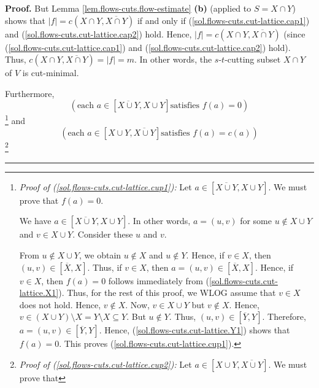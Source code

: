 \documentclass[numbers=enddot,12pt,final,onecolumn,notitlepage]{scrartcl}%
\theoremstyle{definition}
\newenvironment{proof}[1][Proof]{\noindent\textbf{#1.} }{\ \rule{0.5em}{0.5em}}
\begin{document}
\begin{proof}
But Lemma \ref{lem.flows-cuts.flow-estimate} \textbf{(b)} (applied to $S=X\cap
Y$) shows that $\left\vert f\right\vert =c\left(  X\cap Y,\overline{X\cap
Y}\right)  $ if and only if (\ref{sol.flows-cuts.cut-lattice.cap1}) and
(\ref{sol.flows-cuts.cut-lattice.cap2}) hold. Hence, $\left\vert f\right\vert
=c\left(  X\cap Y,\overline{X\cap Y}\right)  $ (since
(\ref{sol.flows-cuts.cut-lattice.cap1}) and
(\ref{sol.flows-cuts.cut-lattice.cap2}) hold). Thus, $c\left(  X\cap
Y,\overline{X\cap Y}\right)  =\left\vert f\right\vert =m$. In other words, the
$s$-$t$-cutting subset $X\cap Y$ of $V$ is cut-minimal.

Furthermore,
\begin{equation}
\left(  \text{each }a\in\left[  \overline{X\cup Y},X\cup Y\right]  \text{
satisfies }f\left(  a\right)  =0\right)
\label{sol.flows-cuts.cut-lattice.cup1}%
\end{equation}
\footnote{\textit{Proof of (\ref{sol.flows-cuts.cut-lattice.cup1}):} Let
$a\in\left[  \overline{X\cup Y},X\cup Y\right]  $. We must prove that
$f\left(  a\right)  =0$.
\par
We have $a\in\left[  \overline{X\cup Y},X\cup Y\right]  $. In other words,
$a=\left(  u,v\right)  $ for some $u\notin X\cup Y$ and $v\in X\cup Y$.
Consider these $u$ and $v$.
\par
From $u\notin X\cup Y$, we obtain $u\notin X$ and $u\notin Y$. Hence, if $v\in
X$, then $\left(  u,v\right)  \in\left[  \overline{X},X\right]  $. Thus, if
$v\in X$, then $a=\left(  u,v\right)  \in\left[  \overline{X},X\right]  $.
Hence, if $v\in X$, then $f\left(  a\right)  =0$ follows immediately from
(\ref{sol.flows-cuts.cut-lattice.X1}). Thus, for the rest of this proof, we
WLOG assume that $v\in X$ does not hold. Hence, $v\notin X$. Now, $v\in X\cup
Y$ but $v\notin X$. Hence, $v\in\left(  X\cup Y\right)  \setminus X=Y\setminus
X\subseteq Y$. But $u\notin Y$. Thus, $\left(  u,v\right)  \in\left[
\overline{Y},Y\right]  $. Therefore, $a=\left(  u,v\right)  \in\left[
\overline{Y},Y\right]  $. Hence, (\ref{sol.flows-cuts.cut-lattice.Y1}) shows
that $f\left(  a\right)  =0$. This proves
(\ref{sol.flows-cuts.cut-lattice.cup1}).} and%
\begin{equation}
\left(  \text{each }a\in\left[  X\cup Y,\overline{X\cup Y}\right]  \text{
satisfies }f\left(  a\right)  =c\left(  a\right)  \right)
\label{sol.flows-cuts.cut-lattice.cup2}%
\end{equation}
\footnote{\textit{Proof of (\ref{sol.flows-cuts.cut-lattice.cup2}):} Let
$a\in\left[  X\cup Y,\overline{X\cup Y}\right]  $. We must prove that
}
\end{proof}
\end{document}
